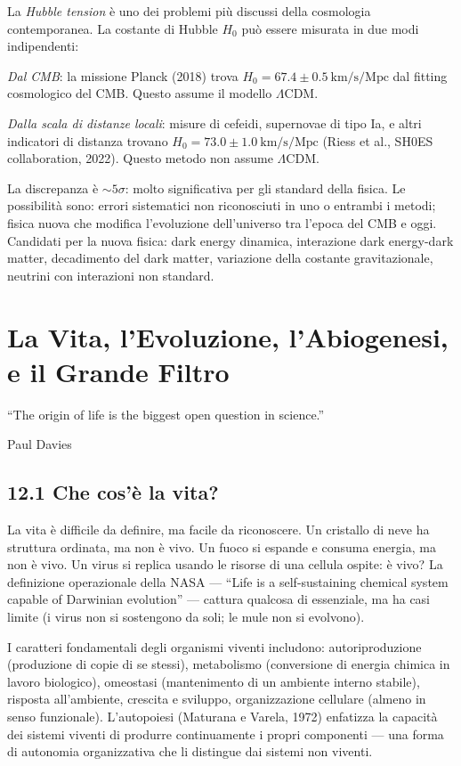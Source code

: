 \documentclass[11.5pt,a4paper,openany]{book}
\theoremstyle{remark}
\begin{document}
La \textit{Hubble tension} è uno dei problemi più discussi della cosmologia contemporanea. La costante di Hubble $H_0$ può essere misurata in due modi indipendenti:

\textit{Dal CMB}: la missione Planck (2018) trova $H_0 = 67.4 \pm 0.5\ \text{km/s/Mpc}$ dal fitting cosmologico del CMB. Questo assume il modello $\Lambda$CDM.

\textit{Dalla scala di distanze locali}: misure di cefeidi, supernovae di tipo Ia, e altri indicatori di distanza trovano $H_0 = 73.0 \pm 1.0\ \text{km/s/Mpc}$ (Riess et al., SH0ES collaboration, 2022). Questo metodo non assume $\Lambda$CDM.

La discrepanza è $\sim 5\sigma$: molto significativa per gli standard della fisica. Le possibilità sono: errori sistematici non riconosciuti in uno o entrambi i metodi; fisica nuova che modifica l'evoluzione dell'universo tra l'epoca del CMB e oggi. Candidati per la nuova fisica: dark energy dinamica, interazione dark energy-dark matter, decadimento del dark matter, variazione della costante gravitazionale, neutrini con interazioni non standard.

\chapter{La Vita, l'Evoluzione, l'Abiogenesi, e il Grande Filtro}

\epigraph{``The origin of life is the biggest open question in science.''}{Paul Davies}

\section{12.1 Che cos'è la vita?}

La vita è difficile da definire, ma facile da riconoscere. Un cristallo di neve ha struttura ordinata, ma non è vivo. Un fuoco si espande e consuma energia, ma non è vivo. Un virus si replica usando le risorse di una cellula ospite: è vivo? La definizione operazionale della NASA --- ``Life is a self-sustaining chemical system capable of Darwinian evolution'' --- cattura qualcosa di essenziale, ma ha casi limite (i virus non si sostengono da soli; le mule non si evolvono).

I caratteri fondamentali degli organismi viventi includono: autoriproduzione (produzione di copie di se stessi), metabolismo (conversione di energia chimica in lavoro biologico), omeostasi (mantenimento di un ambiente interno stabile), risposta all'ambiente, crescita e sviluppo, organizzazione cellulare (almeno in senso funzionale). L'autopoiesi (Maturana e Varela, 1972) enfatizza la capacità dei sistemi viventi di produrre continuamente i propri componenti --- una forma di autonomia organizzativa che li distingue dai sistemi non viventi.
\end{document}
